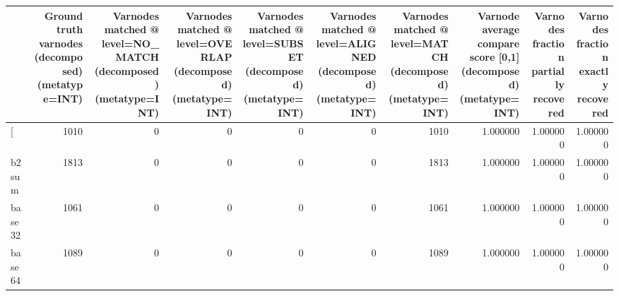 \begin{tabular}{lrrrrrrrrr}
\toprule
{} &  Ground truth varnodes (decomposed) (metatype=INT) &  Varnodes matched @ level=NO\_MATCH (decomposed) (metatype=INT) &  Varnodes matched @ level=OVERLAP (decomposed) (metatype=INT) &  Varnodes matched @ level=SUBSET (decomposed) (metatype=INT) &  Varnodes matched @ level=ALIGNED (decomposed) (metatype=INT) &  Varnodes matched @ level=MATCH (decomposed) (metatype=INT) &  Varnode average compare score [0,1] (decomposed) (metatype=INT) &  Varnodes fraction partially recovered &  Varnodes fraction exactly recovered \\
\midrule
[         &                                               1010 &                                                  0 &                                                  0 &                                                  0 &                                                  0 &                                               1010 &                                           1.000000 &                               1.000000 &                             1.000000 \\
b2sum     &                                               1813 &                                                  0 &                                                  0 &                                                  0 &                                                  0 &                                               1813 &                                           1.000000 &                               1.000000 &                             1.000000 \\
base32    &                                               1061 &                                                  0 &                                                  0 &                                                  0 &                                                  0 &                                               1061 &                                           1.000000 &                               1.000000 &                             1.000000 \\
base64    &                                               1089 &                                                  0 &                                                  0 &                                                  0 &                                                  0 &                                               1089 &                                           1.000000 &                               1.000000 &                             1.000000 \\

\end{tabular}
